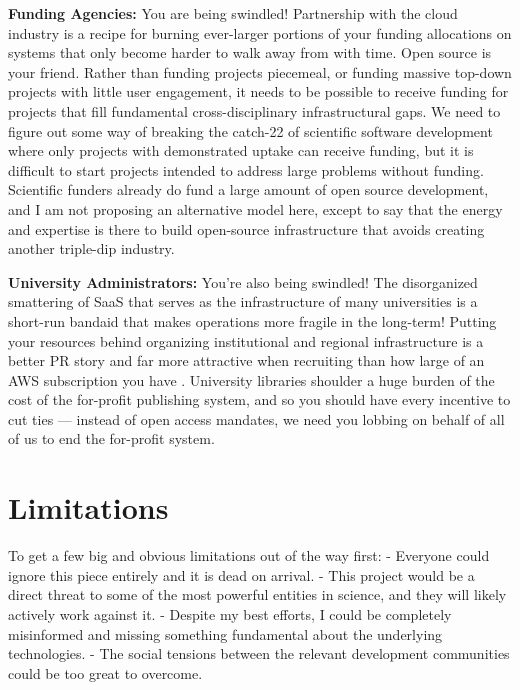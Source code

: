 \textbf{Funding Agencies:} You are being swindled! Partnership with the
cloud industry is a recipe for burning ever-larger portions of your
funding allocations on systems that only become harder to walk away from
with time. Open source is your friend. Rather than funding projects
piecemeal, or funding massive top-down projects with little user
engagement, it needs to be possible to receive funding for projects that
fill fundamental cross-disciplinary infrastructural gaps. We need to
figure out some way of breaking the catch-22 of scientific software
development where only projects with demonstrated uptake can receive
funding, but it is difficult to start projects intended to address large
problems without funding. Scientific funders already do fund a large
amount of open source development, and I am not proposing an alternative
model here, except to say that the energy and expertise is there to
build open-source infrastructure that avoids creating another triple-dip
industry.

\textbf{University Administrators:} You're also being swindled! The
disorganized smattering of SaaS that serves as the infrastructure of
many universities \citep{woodUniversitiesAreAdopting2021}  is a
short-run bandaid that makes operations more fragile in the long-term!
Putting your resources behind organizing institutional and regional
infrastructure is a better PR story and far more attractive when
recruiting than how large of an AWS subscription you have \citep{andreevBiologistsNeedModern2021} . University libraries shoulder a
huge burden of the cost of the for-profit publishing system, and so you
should have every incentive to cut ties --- instead of open access
mandates, we need you lobbing on behalf of all of us to end the
for-profit system.

\hypertarget{limitations}{%
\section{Limitations}\label{limitations}}

To get a few big and obvious limitations out of the way first: -
Everyone could ignore this piece entirely and it is dead on arrival. -
This project would be a direct threat to some of the most powerful
entities in science, and they will likely actively work against it. -
Despite my best efforts, I could be completely misinformed and missing
something fundamental about the underlying technologies. - The social
tensions between the relevant development communities could be too great
to overcome.

